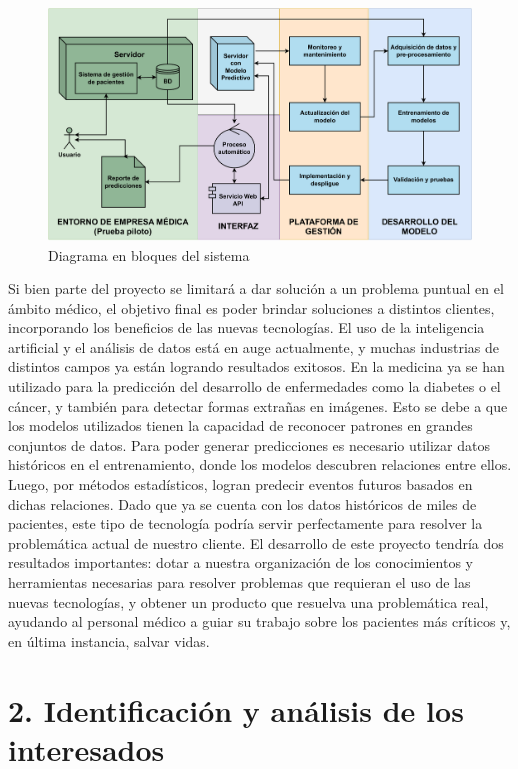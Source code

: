 \documentclass[
11pt, %
]{charter}
\begin{document}
\begin{figure}[htpb]
\centering 
\includegraphics[width=.6\textwidth]{./Figuras/DiagramaDeBloques.pdf}
\caption{Diagrama en bloques del sistema}
\label{fig:diagBloques}
\end{figure}

Si bien parte del proyecto se limitará a dar solución a un problema puntual en el ámbito médico, el objetivo final es poder brindar soluciones a distintos clientes, incorporando los beneficios de las nuevas tecnologías.
El uso de la inteligencia artificial y el análisis de datos está en auge actualmente, y muchas industrias de distintos campos ya están logrando resultados exitosos. En la medicina ya se han utilizado para la predicción del desarrollo de enfermedades como la diabetes o el cáncer, y también para detectar formas extrañas en imágenes. 
Esto se debe a que los modelos utilizados tienen la capacidad de reconocer patrones en grandes conjuntos de datos.
Para poder generar predicciones es necesario utilizar datos históricos en el entrenamiento, donde los modelos descubren relaciones entre ellos. Luego, por métodos estadísticos, logran predecir eventos futuros basados en dichas relaciones.
Dado que ya se cuenta con los datos históricos de miles de pacientes, este tipo de tecnología podría servir perfectamente para resolver la problemática actual de nuestro cliente. 
El desarrollo de este proyecto tendría dos resultados importantes: dotar a nuestra organización de los conocimientos y herramientas necesarias para resolver problemas que requieran el uso de las nuevas tecnologías, y obtener un producto que resuelva una problemática real, ayudando al personal médico a guiar su trabajo sobre los pacientes más críticos y, en última instancia, salvar vidas.

\section{2. Identificación y análisis de los interesados}
\label{sec:interesados}
\end{document}
